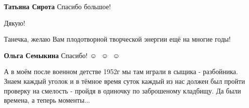 \begin{itemize}
\begin{itemize}
\textbf{Татьяна Сирота} Спасибо большое!
\end{itemize} %

Дякую!

Танечка, желаю Вам плодотворной творческой энергии ещё на многие годы!

\textbf{Ольга Семыкина} Спасибо! ☺ ️  ☺ ️  ☺ ️ 


А в моём после военном детстве 1952г мы там играли в сыщика - разбойника. Знаем
каждый уголок и в тёмное время суток каждый из нас должен был пройти проверку
на смелость - пройдя в одиночку по заброшеному кладбищу. Да были времена, а
теперь моменты...


\end{itemize} %
